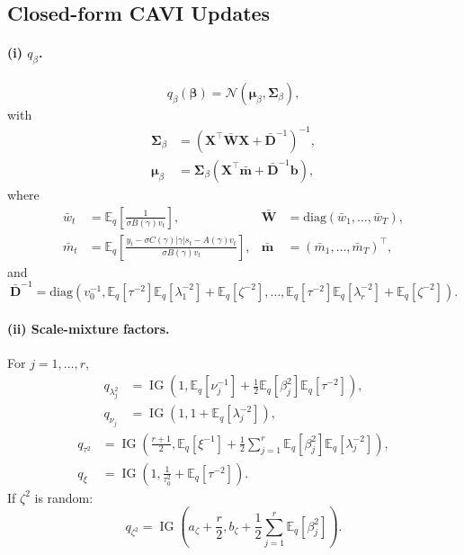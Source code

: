 \documentclass[11pt]{article}
\newcommand{\E}{\mathbb{E}}
\newcommand{\N}{\mathcal{N}}
\newcommand{\diag}{\mathrm{diag}}
\newcommand{\vect}[1]{\bm{#1}}
\newcommand{\mat}[1]{\bm{#1}}
\DeclareMathOperator{\IG}{IG}
\begin{document}
\subsection{Closed-form CAVI Updates}

\paragraph{(i) $q_\beta$.}
\begin{equation}
  q_\beta(\vect{\beta}) = \N(\vect{\mu}_\beta,\mat{\Sigma}_\beta),
\end{equation}
with
\begin{align}
  \mat{\Sigma}_\beta
  &= \left(\mat{X}^\top\bar{\mat{W}}\mat{X} + \bar{\mat{D}}^{-1}\right)^{-1},
  \label{eq:vb-beta-sigma}
  \\
  \vect{\mu}_\beta
  &= \mat{\Sigma}_\beta\left(\mat{X}^\top\bar{\vect{m}} + \bar{\mat{D}}^{-1}\vect{b}\right),
  \label{eq:vb-beta-mu}
\end{align}
where
\begin{align}
  \bar{w}_t &= \E_q\!\left[\frac{1}{\sigma B(\gamma)v_t}\right],
  &
  \bar{\mat{W}} &= \diag(\bar{w}_1,\dots,\bar{w}_T),
  \\
  \bar{m}_t &= \E_q\!\left[
    \frac{y_t-\sigma C(\gamma)|\gamma|s_t-A(\gamma)v_t}{\sigma B(\gamma)v_t}
  \right],
  &
  \bar{\vect{m}} &= (\bar{m}_1,\dots,\bar{m}_T)^\top,
\end{align}
and
\begin{equation}
  \bar{\mat{D}}^{-1}
  = \diag\!\left(
    v_0^{-1},
    \E_q[\tau^{-2}]\E_q[\lambda_1^{-2}] + \E_q[\zeta^{-2}],
    \dots,
    \E_q[\tau^{-2}]\E_q[\lambda_r^{-2}] + \E_q[\zeta^{-2}]
  \right).
\end{equation}

\paragraph{(ii) Scale-mixture factors.}
For $j=1,\dots,r$,
\begin{align}
  q_{\lambda_j^2}
  &= \IG\!\left(
      1,
      \E_q[\nu_j^{-1}] + \frac12\E_q[\beta_j^2]\E_q[\tau^{-2}]
    \right),
  \label{eq:vb-lambda2}
  \\
  q_{\nu_j}
  &= \IG\!\left(
      1,
      1 + \E_q[\lambda_j^{-2}]
    \right),
  \label{eq:vb-nu}
\end{align}
\begin{align}
  q_{\tau^2}
  &= \IG\!\left(
      \frac{r+1}{2},
      \E_q[\xi^{-1}] + \frac12\sum_{j=1}^r \E_q[\beta_j^2]\E_q[\lambda_j^{-2}]
    \right),
  \label{eq:vb-tau2}
  \\
  q_\xi
  &= \IG\!\left(
      1,
      \frac{1}{\tau_0^2} + \E_q[\tau^{-2}]
    \right).
  \label{eq:vb-xi}
\end{align}
If $\zeta^2$ is random:
\begin{equation}
  q_{\zeta^2}
  = \IG\!\left(
      a_\zeta + \frac{r}{2},
      b_\zeta + \frac12\sum_{j=1}^r \E_q[\beta_j^2]
    \right).
  \label{eq:vb-zeta2}
\end{equation}
\end{document}
